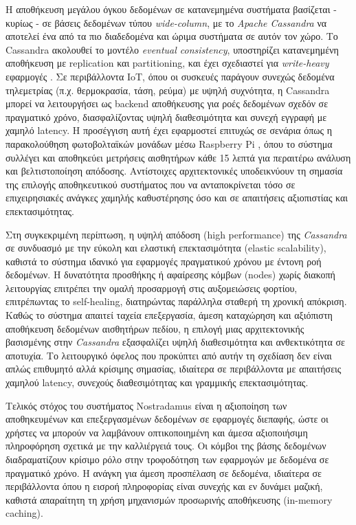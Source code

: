 Η αποθήκευση μεγάλου όγκου δεδομένων σε κατανεμημένα συστήματα βασίζεται -
κυρίως - σε βάσεις δεδομένων τύπου \textit{wide-column}, με το \textit{Apache
	Cassandra} να αποτελεί ένα από τα πιο διαδεδομένα και ώριμα συστήματα σε αυτόν
τον χώρο. Το Cassandra ακολουθεί το μοντέλο \textit{eventual consistency},
υποστηρίζει κατανεμημένη αποθήκευση με replication και partitioning, και έχει
σχεδιαστεί για \textit{write-heavy} εφαρμογές \cite{cassandrawp}. Σε
περιβάλλοντα IoT, όπου οι συσκευές παράγουν συνεχώς δεδομένα τηλεμετρίας (π.χ.
θερμοκρασία, τάση, ρεύμα) με υψηλή συχνότητα, η Cassandra μπορεί να
λειτουργήσει ως backend αποθήκευσης για ροές δεδομένων σχεδόν σε πραγματικό
χρόνο, διασφαλίζοντας υψηλή διαθεσιμότητα και συνεχή εγγραφή με χαμηλό latency.
Η προσέγγιση αυτή έχει εφαρμοστεί επιτυχώς σε σενάρια όπως η παρακολούθηση
φωτοβολταϊκών μονάδων μέσω Raspberry Pi \cite{iotcassandra}, όπου το σύστημα
συλλέγει και αποθηκεύει μετρήσεις αισθητήρων κάθε 15 λεπτά για περαιτέρω
ανάλυση και βελτιστοποίηση απόδοσης. Αντίστοιχες αρχιτεκτονικές υποδεικνύουν τη
σημασία της επιλογής αποθηκευτικού συστήματος που να ανταποκρίνεται τόσο σε
επιχειρησιακές ανάγκες χαμηλής καθυστέρησης όσο και σε απαιτήσεις αξιοπιστίας
και επεκτασιμότητας.

Στη συγκεκριμένη περίπτωση, η υψηλή απόδοση (high performance) της
\textit{Cassandra} σε συνδυασμό με την εύκολη και ελαστική επεκτασιμότητα
(elastic scalability), καθιστά το σύστημα ιδανικό για εφαρμογές πραγματικού
χρόνου με έντονη ροή δεδομένων. Η δυνατότητα προσθήκης ή αφαίρεσης κόμβων
(nodes) χωρίς διακοπή λειτουργίας επιτρέπει την ομαλή προσαρμογή στις
αυξομειώσεις φορτίου, επιτρέπωντας το self-healing, διατηρώντας παράλληλα
σταθερή τη χρονική απόκριση. Καθώς το σύστημα απαιτεί ταχεία επεξεργασία, άμεση
καταχώρηση και αξιόπιστη αποθήκευση δεδομένων αισθητήρων πεδίου, η επιλογή μιας
αρχιτεκτονικής βασισμένης στην \textit{Cassandra} εξασφαλίζει υψηλή
διαθεσιμότητα και ανθεκτικότητα σε αποτυχία. Το λειτουργικό όφελος που
προκύπτει από αυτήν τη σχεδίαση δεν είναι απλώς επιθυμητό αλλά κρίσιμης
σημασίας, ιδιαίτερα σε περιβάλλοντα με απαιτήσεις χαμηλού latency, συνεχούς
διαθεσιμότητας και γραμμικής επεκτασιμότητας.

Τελικός στόχος του συστήματος Nostradamus είναι η αξιοποίηση των αποθηκευμένων
και επεξεργασμένων δεδομένων σε εφαρμογές διεπαφής, ώστε οι χρήστες να μπορούν
να λαμβάνουν οπτικοποιημένη και άμεσα αξιοποιήσιμη πληροφόρηση σχετικά με την
καλλιέργειά τους. Οι κόμβοι της βάσης δεδομένων διαδραματίζουν κρίσιμο ρόλο
στην τροφοδότηση των εφαρμογών με δεδομένα σε πραγματικό χρόνο. Η ανάγκη για
άμεση προσπέλαση σε δεδομένα, ιδιαίτερα σε περιβάλλοντα όπου η εισροή
πληροφορίας είναι συνεχής και εν δυνάμει μαζική, καθιστά απαραίτητη τη χρήση
μηχανισμών προσωρινής αποθήκευσης (in-memory caching).


